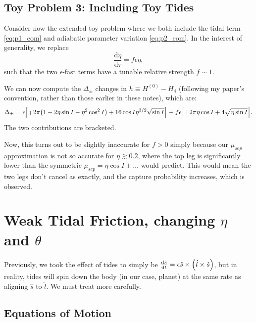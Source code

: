 \documentclass[11pt,
        usenames, %
        dvipsnames %
    ]{article}
\newcommand*{\rd}[2]{\frac{\mathrm{d}#1}{\mathrm{d}#2}}
\DeclarePairedDelimiter\p{\lparen}{\rparen}
\DeclarePairedDelimiter\s{\lbrack}{\rbrack}
\begin{document}
\subsection{Toy Problem 3: Including Toy Tides}

Consider now the extended toy problem where we both include the tidal term
\autoref{eq:p1_eom} and adiabatic parameter variation \autoref{eq:p2_eom}. In
the interest of generality, we replace
\begin{equation}
    \rd{\eta}{\tau} = f \epsilon \eta,
\end{equation}
such that the two $\epsilon$-fast terms have a tunable relative strength
$f \sim 1$.

We can now compute the $\Delta_{\pm}$ changes in $h \equiv H^{(0)} - H_4$
(following my paper's convention, rather than those earlier in these notes),
which are:
\begin{equation}
    \Delta_{\pm} = \epsilon\s*{\mp 2\pi \p*{1 - 2\eta \sin I - \eta^2 \cos^2 I} +
        16\cos I\eta^{3/2}\sqrt{\sin I}} + f\epsilon
            \s*{\pm 2\pi \eta \cos I + 4\sqrt{\eta \sin I}}.
\end{equation}
The two contributions are bracketed.

Now, this turns out to be slightly inaccurate for $f > 0$ simply because our
$\mu_{sep}$ approximation is not so accurate for $\eta \gtrsim 0.2$, where the
top leg is significantly lower than the symmetric $\mu_{sep} = \eta \cos I \pm
\dots$ would predict. This would mean the two legs don't cancel as exactly, and
the capture probability increases, which is observed.

\section{Weak Tidal Friction, changing $\eta$ and $\theta$}

Previously, we took the effect of tides to simply be $\rd{\hat{s}}{t} = \epsilon
\hat{s} \times \p*{\hat{l} \times \hat{s}}$, but in reality, tides will spin
down the body (in our case, planet) at the same rate as aligning $\hat{s}$ to
$\hat{l}$. We must treat more carefully.

\subsection{Equations of Motion}
\end{document}
